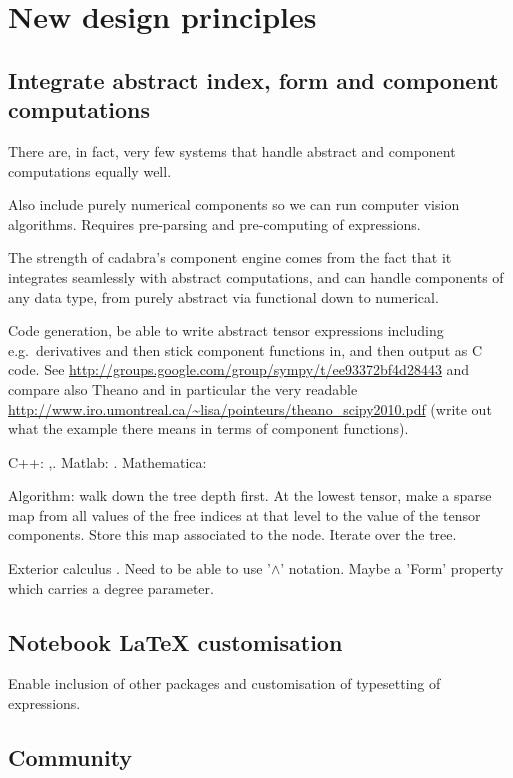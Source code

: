 \documentclass[11pt]{article}
\begin{document}
\section{New design principles}
\subsection{Integrate abstract index, form and component computations}

There are, in fact, very few systems that handle abstract and
component computations equally well.

Also include purely numerical components so we can run computer vision
algorithms. Requires pre-parsing and pre-computing of expressions.

The strength of cadabra's component engine comes from the fact that it
integrates seamlessly with abstract computations, and can handle
components of any data type, from purely abstract via functional down
to numerical.

Code generation, be able to write abstract tensor expressions
including e.g.~derivatives and then stick component functions in, and
then output as C code. See
\url{http://groups.google.com/group/sympy/t/ee93372bf4d28443}
and compare also Theano and in particular the
very readable \url{http://www.iro.umontreal.ca/~lisa/pointeurs/theano_scipy2010.pdf}
(write out what the example there means in terms of component functions).

C++: \cite{ltensor},\cite{ftensor}.
Matlab: \cite{TTB_Software}.
Mathematica: \cite{kranc}

Algorithm: walk down the tree depth first. At the lowest tensor, make
a sparse map from all values of the free indices at that level to the
value of the tensor components. Store this map associated to the
node. Iterate over the tree.

Exterior calculus \cite{xTerior}. Need to be able to use '$\wedge$'
notation. Maybe a 'Form' property which carries a degree parameter.


\subsection{Notebook \LaTeX{} customisation}

Enable inclusion of other packages and customisation of typesetting of expressions.

\subsection{Community}
\end{document}
